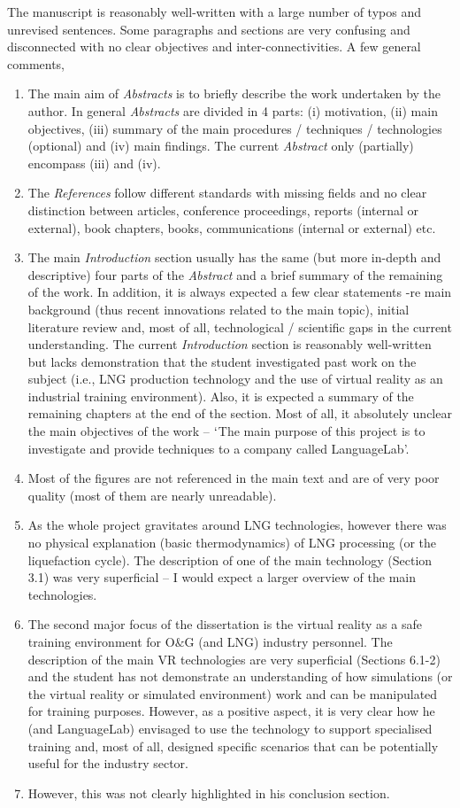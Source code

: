 \documentclass[14pt,twoside]{report}
\begin{document}
The manuscript is reasonably well-written with a large number of typos and unrevised sentences. Some paragraphs and sections are very confusing and disconnected with no clear objectives and inter-connectivities. A few general comments,
\begin{enumerate}
%
\item The main aim of {\it Abstracts} is to briefly describe the work undertaken by the author. In general {\it Abstracts} are divided in 4 parts: (i) motivation, (ii) main objectives, (iii) summary of the main procedures / techniques / technologies (optional) and (iv) main findings. The current {\it Abstract} only (partially) encompass (iii) and (iv).
%
\item The {\it References} follow different standards with missing fields and no clear distinction between articles, conference proceedings, reports (internal or external), book chapters, books, communications (internal or external) etc.  
%
\item The main {\it Introduction} section usually has the same (but more in-depth and descriptive) four parts of the {\it Abstract} and a brief summary of the remaining of the work. In addition, it is always expected a few clear statements -re main background (thus recent innovations related to the main topic), initial literature review and, most of all, technological / scientific gaps in the current understanding. The current {\it Introduction} section is reasonably well-written but lacks demonstration that the student investigated past work on the subject (i.e., LNG production technology and the use of virtual reality as an industrial training environment). Also, it is expected a summary of the remaining chapters at the end of the section. Most of all, it absolutely unclear the main objectives of the work -- $\lq$The main purpose of this project is to investigate and provide techniques to a company called LanguageLab'.
%
\item Most of the figures are not referenced in the main text and are of very poor quality (most of them are nearly unreadable).
%
\item As the whole project gravitates around LNG technologies, however there was no physical explanation (basic thermodynamics) of LNG processing (or the liquefaction cycle). The description of one of the main technology (Section 3.1) was very superficial -- I would expect a larger overview of the main technologies.  
%
\item The second major focus of the dissertation is the virtual reality as a safe training environment for O$\&$G (and LNG) industry personnel. The description of the main VR technologies are very superficial (Sections 6.1-2) and the student has not demonstrate an understanding of how simulations (or the virtual reality or simulated environment) work and can be manipulated for training purposes. However, as a positive aspect, it is very clear how he (and LanguageLab) envisaged to use the technology to support specialised training and, most of all, designed specific scenarios that can be potentially useful for the industry sector.   
%
\item However, this was not clearly highlighted in his conclusion section.
%
\end{enumerate}
\end{document}
